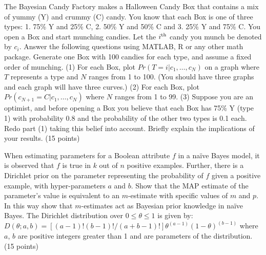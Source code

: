 \documentclass[fleqn]{homework}
\begin{document}
  \maketitle

  \begin{problem}{1}
    \begin{question}
      The Bayesian Candy Factory makes a Halloween Candy Box that contains a mix
      of yummy (Y) and crummy (C) candy. You know that each Box is one of three
      types: 1. 75\% Y and 25\% C, 2.  50\% Y and 50\% C and 3. 25\% Y and 75\%
      C. You open a Box and start munching candies. Let the
      $i\textsuperscript{th}$ candy you munch be denoted by $c_i$. Answer the
      following questions using MATLAB, R or any other math package. Generate
      one Box with 100 candies for each type, and assume a fixed order of
      munching. (1) For each Box, plot $Pr(T=i|c_1,\dots,c_N)$ on a graph where
      $T$ represents a type and $N$ ranges from 1 to 100. (You should have three
      graphs and each graph will have three curves.) (2) For each Box, plot
      $Pr(c_{N+1}=C|c_1,\dots,c_N)$ where $N$ ranges from 1 to 99. (3) Suppose
      you are an optimist, and before opening a Box you believe that each Box
      has 75\% Y (type 1) with probability 0.8 and the probability of the other
      two types is 0.1 each. Redo part (1) taking this belief into
      account. Briefly explain the implications of your results. (15 points)
    \end{question}
  \end{problem}

  \begin{problem}{2}
    \begin{question}
      When estimating parameters for a Boolean attribute $f$ in a na\"ive Bayes
      model, it is observed that $f$ is true in $k$ out of $n$ positive
      examples. Further, there is a Dirichlet prior on the parameter
      representing the probability of $f$ given a positive example, with
      hyper-parameters $a$ and $b$. Show that the MAP estimate of the
      parameter’s value is equivalent to an $m$-estimate with specific values of
      $m$ and $p$. In this way show that $m$-estimates act as Bayesian prior
      knowledge in na\"ive Bayes. The Dirichlet distribution over
      $0 \le \theta \le 1$ is given by:
      $D(\theta;a,b)=[(a-1)! (b-1)! /(a+b-1)!] \theta^{(a-1)} (1-
      \theta)^{(b-1)}$
      where $a$, $b$ are positive integers greater than 1 and are parameters of
      the distribution. (15 points)
    \end{question}
  \end{problem}
\end{document}
